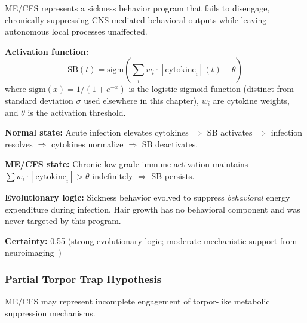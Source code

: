 \begin{hypothesis}
\label{hyp:sickness-behavior}
ME/CFS represents a sickness behavior program that fails to disengage, chronically suppressing CNS-mediated behavioral outputs while leaving autonomous local processes unaffected.

\textbf{Activation function:}
\[
\text{SB}(t) = \mathrm{sigm}\left(\sum_{i} w_i \cdot [\text{cytokine}_i](t) - \theta\right)
\]
where $\mathrm{sigm}(x) = 1/(1+e^{-x})$ is the logistic sigmoid function (distinct from standard deviation $\sigma$ used elsewhere in this chapter), $w_i$ are cytokine weights, and $\theta$ is the activation threshold.

\textbf{Normal state:} Acute infection elevates cytokines $\Rightarrow$ SB activates $\Rightarrow$ infection resolves $\Rightarrow$ cytokines normalize $\Rightarrow$ SB deactivates.

\textbf{ME/CFS state:} Chronic low-grade immune activation maintains $\sum w_i \cdot [\text{cytokine}_i] > \theta$ indefinitely $\Rightarrow$ SB persists.

\textbf{Evolutionary logic:} Sickness behavior evolved to suppress \emph{behavioral} energy expenditure during infection. Hair growth has no behavioral component and was never targeted by this program.

\textbf{Certainty:} 0.55 (strong evolutionary logic; moderate mechanistic support from neuroimaging~\cite{Nakatomi2014neuroinflammation})
\end{hypothesis}


\subsubsection{Partial Torpor Trap Hypothesis}

ME/CFS may represent incomplete engagement of torpor-like metabolic suppression mechanisms.

